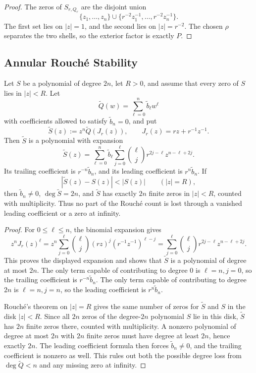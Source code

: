 \begin{proof}
The zeros of \(S_{r,Q_r}\) are the disjoint union
\[
\{z_1,
\dots,z_n\}\cup\{r^{-2}z_1^{-1},
\dots,r^{-2}z_n^{-1}\}.
\]
The first set lies on \(|z|=1\), and the second lies on \(|z|=r^{-2}\).  The chosen \(\rho\) separates the two shells, so the exterior factor is exactly \(P\).
\end{proof}

\subsection{Annular Rouch\'e Stability}\label{subsec:annular-rouche-stability}

\begin{lemma}\label{lem:outer-rouche-prevents-degree-loss}
Let \(S\) be a polynomial of degree \(2n\), let \(R>0\), and assume that every zero of \(S\) lies in \(|z|<R\).  Let
\[
\widetilde Q(w)=\sum_{\ell=0}^{n}\widetilde b_\ell w^\ell
\]
with coefficients allowed to satisfy \(\widetilde b_n=0\), and put
\[
\widetilde S(z):=z^n\widetilde Q(J_r(z)),
\qquad J_r(z)=rz+r^{-1}z^{-1}.
\]
Then \(\widetilde S\) is a polynomial with expansion
\[
\widetilde S(z)=
\sum_{\ell=0}^{n}\widetilde b_\ell
\sum_{j=0}^{\ell}\binom{\ell}{j}r^{2j-\ell}z^{n-\ell+2j}.
\]
Its trailing coefficient is \(r^{-n}\widetilde b_n\), and its leading coefficient is \(r^n\widetilde b_n\).  If
\[
|\widetilde S(z)-S(z)|<|S(z)|\qquad(|z|=R),
\]
then \(\widetilde b_n\ne0\), \(\deg\widetilde S=2n\), and \(\widetilde S\) has exactly \(2n\) finite zeros in \(|z|<R\), counted with multiplicity.  Thus no part of the Rouch\'e count is lost through a vanished leading coefficient or a zero at infinity.
\end{lemma}

\begin{proof}
For \(0\le\ell\le n\), the binomial expansion gives
\[
z^nJ_r(z)^\ell
=z^n\sum_{j=0}^{\ell}\binom{\ell}{j}(rz)^j(r^{-1}z^{-1})^{\ell-j}
=\sum_{j=0}^{\ell}\binom{\ell}{j}r^{2j-\ell}z^{n-\ell+2j}.
\]
This proves the displayed expansion and shows that \(\widetilde S\) is a polynomial of degree at most \(2n\).  The only term capable of contributing to degree \(0\) is \(\ell=n,j=0\), so the trailing coefficient is \(r^{-n}\widetilde b_n\).  The only term capable of contributing to degree \(2n\) is \(\ell=n,j=n\), so the leading coefficient is \(r^n\widetilde b_n\).

Rouch\'e's theorem on \(|z|=R\) gives the same number of zeros for \(\widetilde S\) and \(S\) in the disk \(|z|<R\).  Since all \(2n\) zeros of the degree-\(2n\) polynomial \(S\) lie in this disk, \(\widetilde S\) has \(2n\) finite zeros there, counted with multiplicity.  A nonzero polynomial of degree at most \(2n\) with \(2n\) finite zeros must have degree at least \(2n\), hence exactly \(2n\).  The leading coefficient formula then forces \(\widetilde b_n\ne0\), and the trailing coefficient is nonzero as well.  This rules out both the possible degree loss from \(\deg\widetilde Q<n\) and any missing zero at infinity.
\end{proof}

